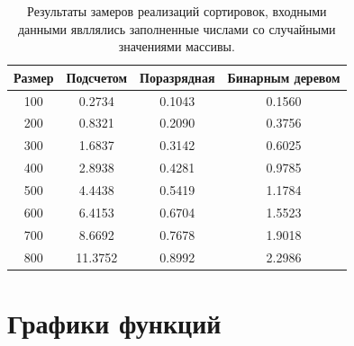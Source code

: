 \newpage

\begin{table}[ht!]
	\begin{center}
			\captionsetup{justification=raggedleft,singlelinecheck=off}
			\caption{Результаты замеров реализаций сортировок, входными данными явллялись заполненные числами со случайными значениями массивы.}
			\label{tbl:random}
			\begin{tabular}{|c|c|c|c|}
				\hline
				Размер & Подсчетом &  Поразрядная &  Бинарным деревом \\
				\hline
				100 & 0.2734 & 0.1043 & 0.1560 \\ 
				\hline
				200 & 0.8321 & 0.2090 & 0.3756 \\ 
				\hline
				300 & 1.6837 & 0.3142 & 0.6025 \\ 
				\hline
				400 & 2.8938 & 0.4281 & 0.9785 \\ 
				\hline
				500 & 4.4438 & 0.5419 & 1.1784 \\ 
				\hline
				600 & 6.4153 & 0.6704 & 1.5523 \\ 
				\hline
				700 & 8.6692 & 0.7678 & 1.9018 \\ 
				\hline
				800 & 11.3752 & 0.8992 & 2.2986 \\ 
				\hline
			\end{tabular}
	\end{center}
\end{table}

\newpage
\section{Графики функций}


